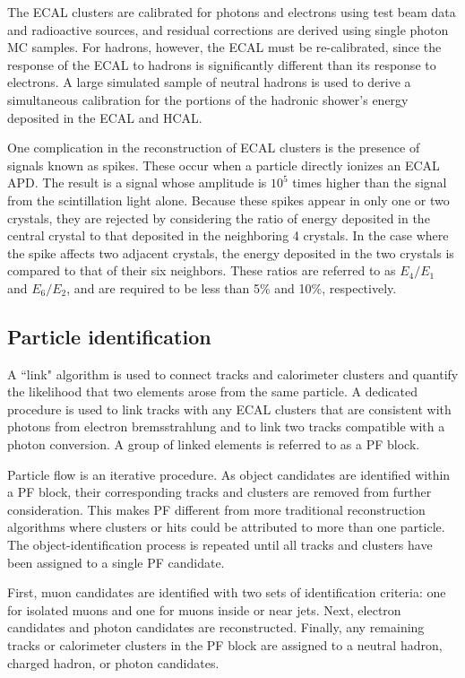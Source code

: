 The ECAL clusters are calibrated for photons and electrons using test beam data and radioactive sources, and residual corrections are derived using single photon MC samples. For hadrons, however, the ECAL must be re-calibrated, since the response of the ECAL to hadrons is significantly different than its response to electrons. A large simulated sample of neutral hadrons is used to derive a simultaneous calibration for the portions of the hadronic shower's energy deposited in the ECAL and HCAL. 

One complication in the reconstruction of ECAL clusters is the presence of signals known as spikes. These occur when a particle directly ionizes an ECAL APD. The result is a signal whose amplitude is $10^5$ times higher than the signal from the scintillation light alone. Because these spikes appear in only one or two crystals, they are rejected by considering the ratio of energy deposited in the central crystal to that deposited in the neighboring 4 crystals. In the case where the spike affects two adjacent crystals, the energy deposited in the two crystals is compared to that of their six neighbors. These ratios are referred to as $E_4/E_1$ and $E_6/E_2$, and are required to be less than 5\% and 10\%, respectively. 

\subsection{Particle identification}
\label{sec:partID}
A ``link" algorithm is used to connect tracks and calorimeter clusters and quantify the likelihood that two elements arose from the same particle. A dedicated procedure is used to link tracks with any ECAL clusters that are consistent with photons from electron bremsstrahlung  and to link two tracks compatible with a photon conversion. A group of linked elements is referred to as a PF block. 

Particle flow is an iterative procedure. As object candidates are identified within a PF block, their corresponding tracks and clusters are removed from further consideration. This makes PF different from more traditional reconstruction algorithms where clusters or hits could be attributed to more than one particle. The object-identification process is repeated until all tracks and clusters have been assigned to a single PF candidate. 

First, muon candidates are identified with two sets of identification criteria: one for isolated muons and one for muons inside or near jets. Next, electron candidates and photon candidates are reconstructed. Finally, any remaining tracks or calorimeter clusters in the PF block are assigned to a neutral hadron, charged hadron, or photon candidates.

